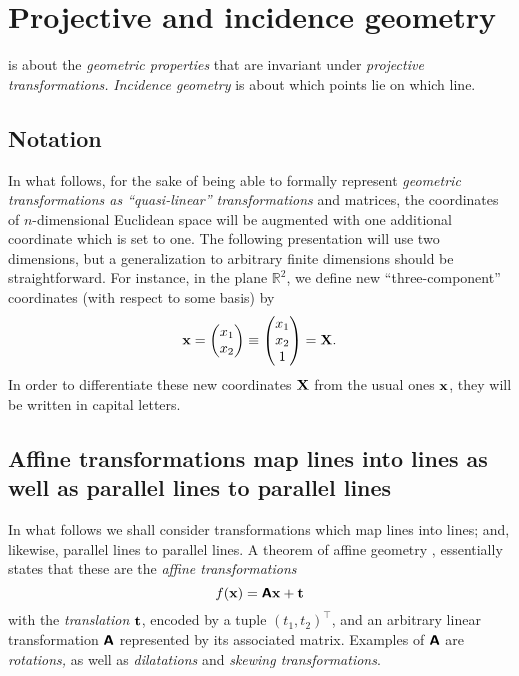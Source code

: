 \chapter{Projective and incidence geometry}
\label{2012-m-ch-projgeom}

 is about the {\em geometric properties} that are invariant under
{\em projective transformations.}
{\em Incidence geometry} is about which points lie on which line.

\section{Notation}
In what follows, for the sake of being able to formally represent {\em geometric transformations as
``quasi-linear'' transformations} and matrices,
the coordinates of $n$-dimensional Euclidean space will be augmented with one additional coordinate
which is set to one.
The following presentation will use two dimensions, but a generalization to arbitrary finite dimensions should be straightforward.
For instance, in the plane $\mathbb{R}^2$, we define new ``three-component'' coordinates
(with respect to some basis) by
\begin{equation}
{\bf x} =
\begin{pmatrix}
x_1\\
x_2
\end{pmatrix}
\equiv
\begin{pmatrix}
x_1\\
x_2 \\
1
\end{pmatrix}
 =  {\bf X}
.
\end{equation}
In order to differentiate these new coordinates ${\bf X}$
from the usual ones ${\bf x}$, they will be written in capital letters.



\section{Affine transformations map lines into lines as well as parallel lines to parallel lines}

In what follows we shall consider transformations which map lines into lines; and, likewise,
parallel lines to parallel lines.
A theorem of affine geometry  \cite{Stothers-ag,Gruenberg-77,Artstein-Avidan-2016},
essentially states that these are the {\em affine transformations}
\begin{equation}
f({\bf x})
=   \textsf{\textbf{A}}{\bf x} + {\bf t}
\end{equation}
with the {\em translation}
  ${\bf t}$, encoded by a tuple $(t_1,t_2)^\intercal $,
and an arbitrary linear transformation
$\textsf{\textbf{A}}$ represented by its associated matrix.
Examples of $\textsf{\textbf{A}}$ are
 {\em rotations,} as well as {\em dilatations}  and {\em skewing transformations}.

